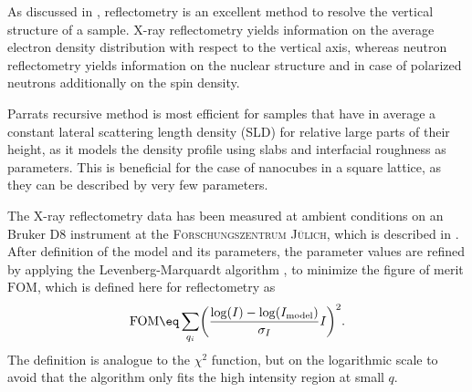 \documentclass[\main/dresen_thesis.tex]{subfiles}
\begin{document}
  \label{sec:monolayers:structure:verticalModel}
  As discussed in , reflectometry is an excellent method to resolve the vertical structure of a sample.
  X-ray reflectometry yields information on the average electron density distribution with respect to the vertical axis, whereas neutron reflectometry yields information on the nuclear structure and in case of polarized neutrons additionally on the spin density.

  Parrats recursive method is most efficient for samples that have in average a constant lateral scattering length density (SLD) for relative large parts of their height, as it models the density profile using slabs and interfacial roughness as parameters.
  This is beneficial for the case of nanocubes in a square lattice, as they can be described by very few parameters.

  The X-ray reflectometry data has been measured at ambient conditions on an Bruker D8 instrument at the \textsc{Forschungszentrum J\"ulich}, which is described in .
  After definition of the model and its parameters, the parameter values are refined by applying the Levenberg-Marquardt algorithm \cite{Marquardt_1963_Analgo}, to minimize the figure of merit $\mathrm{FOM}$, which is defined here for reflectometry as
  \begin{align}
    \mathrm{FOM} \eq \sum_{q_i} \biggl( \frac{\log(I) - \log(I_\mathrm{model})}{\sigma_{I}} I\biggr)^2.
  \end{align}
  The definition is analogue to the $\chi^2$ function, but on the logarithmic scale to avoid that the algorithm only fits the high intensity region at small $q$.
\end{document}
